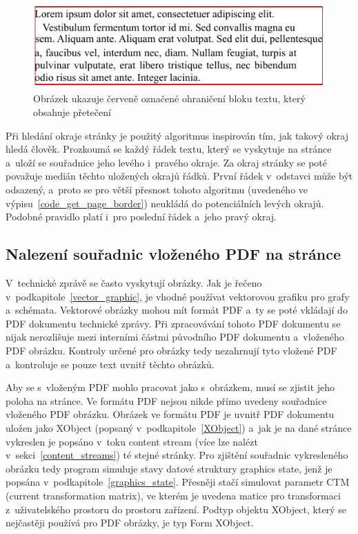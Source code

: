 \begin{figure}[H]
    \centering
    \includegraphics[width=0.7\linewidth]{obrazky-figures/block_bbox.pdf}
    \caption{Obrázek ukazuje červeně označené ohraničení bloku textu, který obsahuje přetečení}
    \label{pic_block_bbox}
\end{figure}

Při hledání okraje stránky je použitý algoritmus inspirován tím, jak takový
okraj hledá člověk. Prozkoumá se každý řádek textu, který se vyskytuje na
stránce a~uloží se souřadnice jeho levého i~pravého okraje. Za okraj stránky se
poté považuje medián těchto uložených okrajů řádků. První řádek v~odstavci 
může být odsazený, a~proto se pro větší přesnost tohoto algoritmu (uvedeného
ve výpisu~\ref{code_get_page_border}) neukládá do potenciálních levých okrajů.
Podobné pravidlo platí i~pro poslední řádek a~jeho pravý okraj.

\noindent\begin{minipage}{\linewidth}
    \hfill
    
\end{minipage}
 

\subsection*{Nalezení souřadnic vloženého PDF na stránce}
V~technické zprávě se často vyskytují obrázky. Jak je řečeno 
v~podkapitole~\ref{vector_graphic}, je vhodné používat vektorovou grafiku
pro grafy a~schémata. Vektorové obrázky mohou mít formát PDF a~ty se poté
vkládají do PDF dokumentu technické zprávy. Při zpracovávání tohoto PDF dokumentu
se nijak nerozlišuje mezi interními částmi původního PDF dokumentu a~vloženého
PDF obrázku. Kontroly určené pro obrázky tedy nezahrnují tyto vložené PDF
a~kontroluje se pouze text uvnitř těchto obrázků.

Aby se s~vloženým PDF mohlo pracovat jako s~obrázkem, musí se zjistit
jeho poloha na stránce. Ve formátu PDF nejsou nikde přímo uvedeny souřadnice
vloženého PDF obrázku. Obrázek ve formátu PDF je uvnitř PDF dokumentu uložen
jako XObject (popsaný v~podkapitole~\ref{XObject}) a~jak je na dané stránce
vykreslen je popsáno v~toku content stream (více lze nalézt
v~sekci~\ref{content_streams}) té stejné stránky.
Pro zjištění souřadnic vykresleného obrázku tedy program simuluje
stavy datové struktury graphics state, jenž je popsána
v~podkapitole~\ref{graphics_state}. Přesněji stačí simulovat parametr
CTM (current transformation matrix), ve kterém je uvedena matice pro transformaci
z~uživatelského prostoru do prostoru zařízení. Podtyp objektu XObject, který se
nejčastěji používá pro PDF obrázky, je typ Form XObject.

